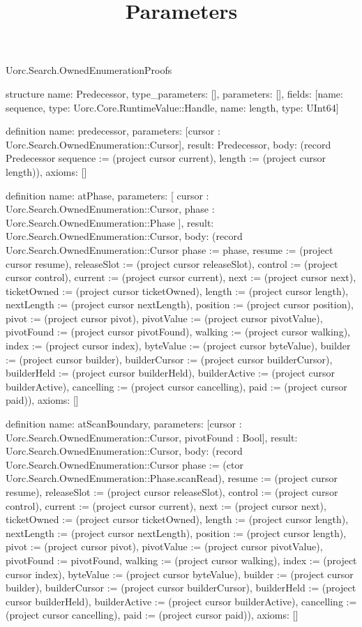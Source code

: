\begin{lexlean}{Uorc.Search.OwnedEnumerationProofs}
\title{Parameters}
\begin{semanticmodule}
structure{
  name: Predecessor,
  type_parameters: [],
  parameters: [],
  fields: [{name: sequence, type: Uorc.Core.RuntimeValue::Handle}, {name: length, type: UInt64}]
}

definition{
  name: predecessor,
  parameters: [cursor : Uorc.Search.OwnedEnumeration::Cursor],
  result: Predecessor,
  body: (record Predecessor {sequence := (project cursor current), length := (project cursor length)}),
  axioms: []
}

definition{
  name: atPhase,
  parameters: [
    cursor : Uorc.Search.OwnedEnumeration::Cursor,
    phase : Uorc.Search.OwnedEnumeration::Phase
  ],
  result: Uorc.Search.OwnedEnumeration::Cursor,
  body: (record Uorc.Search.OwnedEnumeration::Cursor {phase := phase, resume := (project cursor resume), releaseSlot := (project cursor releaseSlot), control := (project cursor control), current := (project cursor current), next := (project cursor next), ticketOwned := (project cursor ticketOwned), length := (project cursor length), nextLength := (project cursor nextLength), position := (project cursor position), pivot := (project cursor pivot), pivotValue := (project cursor pivotValue), pivotFound := (project cursor pivotFound), walking := (project cursor walking), index := (project cursor index), byteValue := (project cursor byteValue), builder := (project cursor builder), builderCursor := (project cursor builderCursor), builderHeld := (project cursor builderHeld), builderActive := (project cursor builderActive), cancelling := (project cursor cancelling), paid := (project cursor paid)}),
  axioms: []
}

definition{
  name: atScanBoundary,
  parameters: [cursor : Uorc.Search.OwnedEnumeration::Cursor, pivotFound : Bool],
  result: Uorc.Search.OwnedEnumeration::Cursor,
  body: (record Uorc.Search.OwnedEnumeration::Cursor {phase := (ctor Uorc.Search.OwnedEnumeration::Phase.scanRead), resume := (project cursor resume), releaseSlot := (project cursor releaseSlot), control := (project cursor control), current := (project cursor current), next := (project cursor next), ticketOwned := (project cursor ticketOwned), length := (project cursor length), nextLength := (project cursor nextLength), position := (project cursor length), pivot := (project cursor pivot), pivotValue := (project cursor pivotValue), pivotFound := pivotFound, walking := (project cursor walking), index := (project cursor index), byteValue := (project cursor byteValue), builder := (project cursor builder), builderCursor := (project cursor builderCursor), builderHeld := (project cursor builderHeld), builderActive := (project cursor builderActive), cancelling := (project cursor cancelling), paid := (project cursor paid)}),
  axioms: []
}


\end{semanticmodule}
\end{lexlean}
